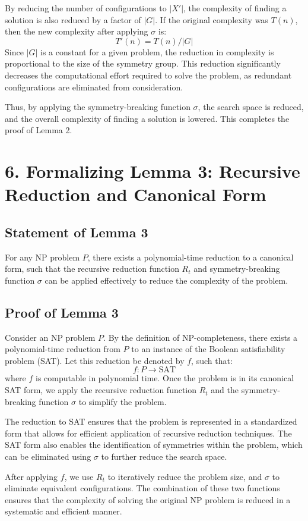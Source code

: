 \documentclass{article}
\begin{document}
By reducing the number of configurations to $|X'|$, the complexity of finding a solution is also reduced by a factor of $|G|$. If the original complexity was $T(n)$, then the new complexity after applying $\sigma$ is:
\[
    T'(n) = T(n) / |G|
\]
Since $|G|$ is a constant for a given problem, the reduction in complexity is proportional to the size of the symmetry group. This reduction significantly decreases the computational effort required to solve the problem, as redundant configurations are eliminated from consideration.

Thus, by applying the symmetry-breaking function $\sigma$, the search space is reduced, and the overall complexity of finding a solution is lowered. This completes the proof of Lemma 2.

\section*{6. Formalizing Lemma 3: Recursive Reduction and Canonical Form}
\subsection*{Statement of Lemma 3}
For any NP problem $P$, there exists a polynomial-time reduction to a canonical form, such that the recursive reduction function $R_t$ and symmetry-breaking function $\sigma$ can be applied effectively to reduce the complexity of the problem.

\subsection*{Proof of Lemma 3}
Consider an NP problem $P$. By the definition of NP-completeness, there exists a polynomial-time reduction from $P$ to an instance of the Boolean satisfiability problem (SAT). Let this reduction be denoted by $f$, such that:
\[
    f: P \rightarrow \text{SAT}
\]
where $f$ is computable in polynomial time. Once the problem is in its canonical SAT form, we apply the recursive reduction function $R_t$ and the symmetry-breaking function $\sigma$ to simplify the problem.

The reduction to SAT ensures that the problem is represented in a standardized form that allows for efficient application of recursive reduction techniques. The SAT form also enables the identification of symmetries within the problem, which can be eliminated using $\sigma$ to further reduce the search space.

After applying $f$, we use $R_t$ to iteratively reduce the problem size, and $\sigma$ to eliminate equivalent configurations. The combination of these two functions ensures that the complexity of solving the original NP problem is reduced in a systematic and efficient manner.
\end{document}

